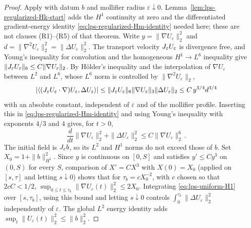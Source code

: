 \documentclass[11pt,letterpaper]{article}
\numberwithin{equation}{section}
\theoremstyle{plain}
\theoremstyle{definition}
\theoremstyle{remark}
\begin{document}
\begin{proof}
Apply \cite[Theorem~9.4]{CKNLean} with datum $b$ and mollifier
radius $\varepsilon\downarrow0$. Lemma~\ref{lem:lps-regularized-Hk-start}
adds the $H^1$ continuity at zero and the differentiated gradient-energy
identity \eqref{eq:lps-regularized-Hm-identity} needed here; these are not
clauses (R1)--(R5) of that theorem. Write $y=\|\nabla U_\varepsilon\|_2^2$
and $d=\|\nabla^2U_\varepsilon\|_2^2=\|\Delta U_\varepsilon\|_2^2$. The
transport velocity $J_\varepsilon U_\varepsilon$ is divergence free, and Young's
inequality for convolution and the homogeneous $H^1\to L^6$ inequality give
$\|J_\varepsilon U_\varepsilon\|_6\le C\|\nabla U_\varepsilon\|_2$. By H\"older's
inequality and the interpolation of $\nabla U_\varepsilon$ between $L^2$ and
$L^6$, whose $L^6$ norm is controlled by $\|\nabla^2U_\varepsilon\|_2$,
\[
|\langle(J_\varepsilon U_\varepsilon\cdot\nabla)U_\varepsilon,\Delta U_\varepsilon\rangle|
\le\|J_\varepsilon U_\varepsilon\|_6\|\nabla U_\varepsilon\|_3\|\Delta U_\varepsilon\|_2
\le C\,y^{3/4}d^{3/4}
\]
with an absolute constant, independent of $\varepsilon$ and of the mollifier
profile. Inserting this in \eqref{eq:lps-regularized-Hm-identity} and using
Young's inequality with exponents $4/3$ and $4$ gives, for $t>0$,
\begin{equation}\label{eq:lps-uniform-H1}
\frac{d}{dt}\|\nabla U_\varepsilon\|_2^2
 +\|\Delta U_\varepsilon\|_2^2
\le C\|\nabla U_\varepsilon\|_2^6\,.
\end{equation}
The initial field is $J_\varepsilon b$, so its $L^2$ and $H^1$ norms do not
exceed those of $b$. Set $X_0=1+\|b\|_{H^1}^2$. Since $y$ is continuous on $[0,S]$ and
satisfies $y'\le Cy^3$ on $(0,S)$ for every $S$, comparison of
$X'=CX^3$ with $X(0)=X_0$ (applied on $[s,\tau]$ and letting $s\downarrow0$)
shows that for
$\tau_b=cX_0^{-2}$, with $c$ chosen so that $2cC<1/2$,
$\sup_{0\le t\le\tau_b}\|\nabla U_\varepsilon(t)\|_2^2
\le2X_0$. Integrating \eqref{eq:lps-uniform-H1} over $[s,\tau_b]$, using this
bound and letting $s\downarrow0$ controls $\int_0^{\tau_b}\|\Delta U_\varepsilon\|_2^2$
independently of $\varepsilon$. The global $L^2$ energy identity adds
$\sup_t\|U_\varepsilon(t)\|_2^2\le\|b\|_2^2$.


\end{proof}
\end{document}
